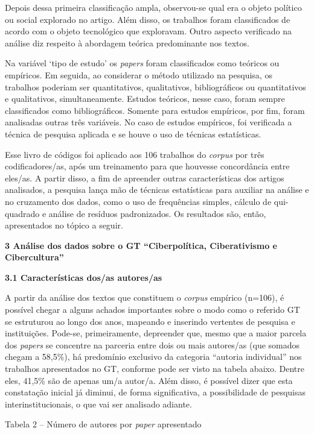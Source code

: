 Depois dessa primeira classificação ampla, observou-se qual era o objeto
político ou social explorado no artigo. Além disso, os trabalhos foram
classificados de acordo com o objeto tecnológico que exploravam. Outro
aspecto verificado na análise diz respeito à abordagem teórica
predominante nos textos.

Na variável `tipo de estudo' os \emph{papers} foram classificados como
teóricos ou empíricos. Em seguida, ao considerar o método utilizado na
pesquisa, os trabalhos poderiam ser quantitativos, qualitativos,
bibliográficos ou quantitativos e qualitativos, simultaneamente. Estudos
teóricos, nesse caso, foram sempre classificados como bibliográficos.
Somente para estudos empíricos, por fim, foram analisadas outras três
variáveis. No caso de estudos empíricos, foi verificada a técnica de
pesquisa aplicada e se houve o uso de técnicas estatísticas.

Esse livro de códigos foi aplicado aos 106 trabalhos do \emph{corpus}
por três codificadores/as, após um treinamento para que houvesse
concordância entre eles/as. A partir disso, a fim de apreender outras
características dos artigos analisados, a pesquisa lança mão de técnicas
estatísticas para auxiliar na análise e no cruzamento dos dados, como o
uso de frequências simples, cálculo de qui-quadrado e análise de
resíduos padronizados. Os resultados são, então, apresentados no tópico
a seguir.

\textbf{3 Análise dos dados sobre o GT ``Ciberpolítica, Ciberativismo e
Cibercultura''}

\textbf{3.1 Características dos/as autores/as}

A partir da análise dos textos que constituem o \emph{corpus} empírico
(n=106), é possível chegar a alguns achados importantes sobre o modo
como o referido GT se estruturou ao longo dos anos, mapeando e inserindo
vertentes de pesquisa e instituições. Pode-se, primeiramente, depreender
que, mesmo que a maior parcela dos \emph{papers} se concentre na
parceria entre dois ou mais autores/as (que somados chegam a 58,5\%), há
predomínio exclusivo da categoria ``autoria individual'' nos trabalhos
apresentados no GT, conforme pode ser visto na tabela abaixo. Dentre
eles, 41,5\% são de apenas um/a autor/a. Além disso, é possível dizer
que esta constatação inicial já diminui, de forma significativa, a
possibilidade de pesquisas interinstitucionais, o que vai ser analisado
adiante.

Tabela 2 -- Número de autores por \emph{paper} apresentado

